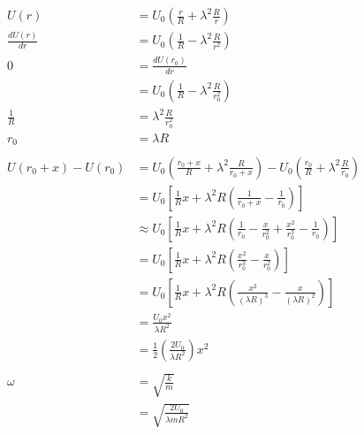 \documentclass{article}
\begin{document}
\begin{align*}
  U(r)                & = U_0 \left( \frac{r}{R} + \lambda^2 \frac{R}{r} \right)                                                                                  \\
  \frac{d U(r)}{d r}  & = U_0 \left( \frac{1}{R} - \lambda^2 \frac{R}{r^2} \right)                                                                                \\
  0                   & = \frac{d U(r_0)}{d r}                                                                                                                    \\
                      & = U_0 \left( \frac{1}{R} - \lambda^2 \frac{R}{r_0^2} \right)                                                                              \\
  \frac{1}{R}         & = \lambda^2 \frac{R}{r_0^2}                                                                                                               \\
  r_0                 & = \lambda R                                                                                                                               \\ \\
  U(r_0 + x) - U(r_0) & = U_0 \left( \frac{r_0 + x}{R} + \lambda^2 \frac{R}{r_0 + x} \right) - U_0 \left( \frac{r_0}{R} + \lambda^2 \frac{R}{r_0} \right)         \\
                      & = U_0 \left[ \frac{1}{R} x + \lambda^2 R \left( \frac{1}{r_0 + x} - \frac{1}{r_0} \right) \right]                                         \\
                      & \approx U_0 \left[ \frac{1}{R} x + \lambda^2 R \left( \frac{1}{r_0} - \frac{x}{r_0^2} + \frac{x^2}{r_0^3} - \frac{1}{r_0} \right) \right] \\
                      & = U_0 \left[ \frac{1}{R} x + \lambda^2 R \left( \frac{x^2}{r_0^3} - \frac{x}{r_0^2} \right) \right]                                       \\
                      & = U_0 \left[ \frac{1}{R} x + \lambda^2 R \left( \frac{x^2}{(\lambda R)^3} - \frac{x}{(\lambda R)^2} \right) \right]                       \\
                      & = \frac{U_0 x^2}{\lambda R^2}                                                                                                             \\
                      & = \frac{1}{2} \left( \frac{2 U_0}{\lambda R^2} \right) x^2                                                                                \\ \\
  \omega              & = \sqrt{\frac{k}{m}}                                                                                                                      \\
                      & = \sqrt{\frac{2 U_0}{\lambda m R^2}}
\end{align*}
\end{document}
